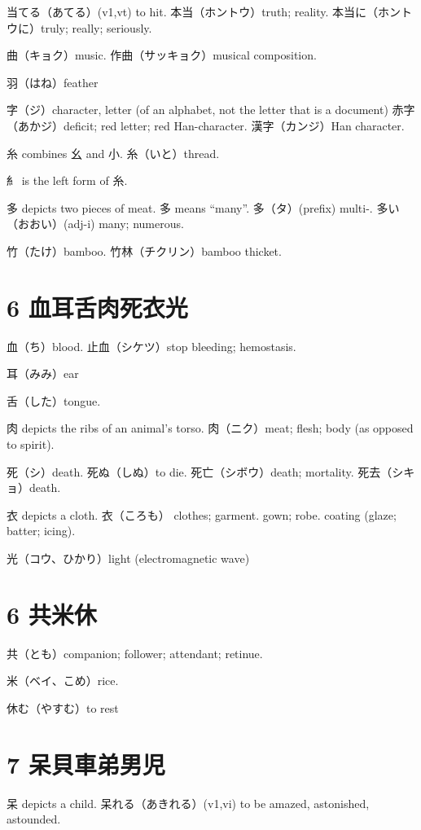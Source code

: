 当てる（あてる）(v1,vt) to hit.
本当（ホントウ）truth; reality.
本当に（ホントウに）truly; really; seriously.

曲（キョク）music.
作曲（サッキョク）musical composition.

羽（はね）feather

字（ジ）character, letter (of an alphabet, not the letter that is a document)
赤字（あかジ）deficit; red letter; red Han-character.
漢字（カンジ）Han character.

糸 combines 幺 and 小.
糸（いと）thread.

糹 is the left form of 糸.

多 depicts two pieces of meat.
多 means ``many''.
多（タ）(prefix) multi-.
多い（おおい）(adj-i) many; numerous.

竹（たけ）bamboo.
竹林（チクリン）bamboo thicket.

\section{6 血耳舌肉死衣光}

血（ち）blood.
止血（シケツ）stop bleeding; hemostasis.

耳（みみ）ear

舌（した）tongue.

肉 depicts the ribs of an animal's torso.
肉（ニク）meat; flesh; body (as opposed to spirit).

死（シ）death.
死ぬ（しぬ）to die.
死亡（シボウ）death; mortality.
死去（シキョ）death.

衣 depicts a cloth.
衣（ころも）
clothes;
garment. gown;
robe. coating (glaze; batter; icing).

光（コウ、ひかり）light (electromagnetic wave)

\section{6 共米休}

共（とも）companion; follower; attendant; retinue.

米（ベイ、こめ）rice.

休む（やすむ）to rest

\section{7 呆貝車弟男児}

呆 depicts a child.
呆れる（あきれる）(v1,vi) to be amazed, astonished, astounded.

